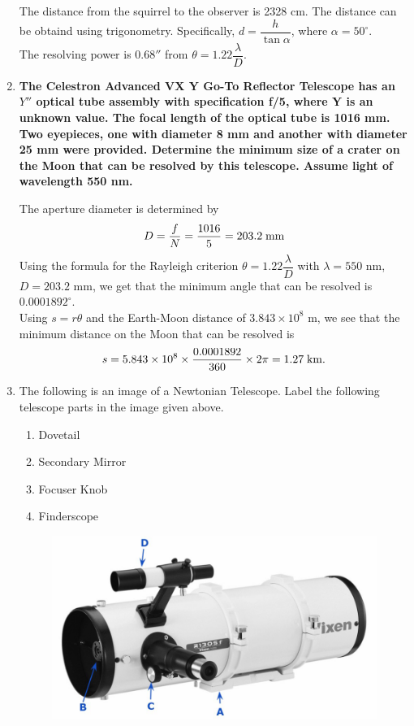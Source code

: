 \documentclass[a4paper,12pt]{extarticle}
\begin{document}
\begin{enumerate}
\begin{sol}
The distance from the squirrel to the observer is 2328 cm. The distance can be obtaind using trigonometry. Specifically, $d=\dfrac{h}{\tan \alpha}$, where $\alpha = 50^\circ$.\\

The resolving power is $0.68''$ from $\theta =1.22\dfrac{\lambda}{D}$. \end{sol}

\item \textbf{The Celestron Advanced VX Y Go-To Reflector Telescope has an $Y''$ optical tube assembly with specification f/5, where Y is an unknown value. The focal length of the optical tube is 1016 mm. Two eyepieces, one with diameter 8 mm and another with diameter 25 mm were provided. Determine the minimum size of a crater on the Moon that can be resolved by this telescope. Assume light of wavelength 550 nm.}

\begin{sol}
The aperture diameter is determined by
\[D=\frac{f}{N}=\frac{1016}{5}= 203.2 \; \rm mm\]
Using the formula for the Rayleigh criterion $\theta =1.22\dfrac{\lambda}{D}$ with $\lambda= 550$ nm, $D = 203.2$ mm, we get that the minimum angle that can be resolved is $0.0001892^\circ$.\\

Using $s = r\theta$ and the Earth-Moon distance of $3.843\times 10^8$ m, we see that the minimum distance on the Moon that can be resolved is
\[s=5.843\times 10^8 \times  \frac{0.0001892}{360}\times 2\pi =1.27\; \rm km.\]
\end{sol}
\item The following is an image of a Newtonian Telescope.
Label the following telescope parts in the image given above.
\begin{multicols}{4}
	\begin{enumerate}[A:]
		\item Dovetail
		\item Secondary Mirror
		\item Focuser Knob
		\item Finderscope
	\end{enumerate}
\end{multicols}

\begin{sol}
	\begin{figure}[H]
		\centering
		\includegraphics[width=0.8\linewidth]{tel_identify.png}
	\end{figure}
\end{sol}

\end{enumerate}
\end{document}
